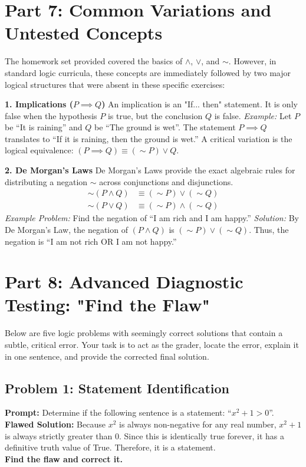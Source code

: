 \documentclass[11pt]{article}
\begin{document}
\section{Part 7: Common Variations and Untested Concepts}

The homework set provided covered the basics of $\land$, $\lor$, and $\sim$. However, in standard logic curricula, these concepts are immediately followed by two major logical structures that were absent in these specific exercises:

\textbf{1. Implications ($P \implies Q$)} 
An implication is an "If... then" statement. It is only false when the hypothesis $P$ is true, but the conclusion $Q$ is false. 
\textit{Example:} Let $P$ be ``It is raining'' and $Q$ be ``The ground is wet''. The statement $P \implies Q$ translates to ``If it is raining, then the ground is wet.''
A critical variation is the logical equivalence: $(P \implies Q) \equiv (\sim P) \lor Q$. 

\textbf{2. De Morgan's Laws}
De Morgan's Laws provide the exact algebraic rules for distributing a negation $\sim$ across conjunctions and disjunctions.
\begin{align*}
    \sim (P \land Q) &\equiv (\sim P) \lor (\sim Q) \\
    \sim (P \lor Q) &\equiv (\sim P) \land (\sim Q)
\end{align*}
\textit{Example Problem:} Find the negation of ``I am rich and I am happy.''
\textit{Solution:} By De Morgan's Law, the negation of $(P \land Q)$ is $(\sim P) \lor (\sim Q)$. Thus, the negation is ``I am not rich OR I am not happy.''

\section{Part 8: Advanced Diagnostic Testing: "Find the Flaw"}

Below are five logic problems with seemingly correct solutions that contain a subtle, critical error. Your task is to act as the grader, locate the error, explain it in one sentence, and provide the corrected final solution.

\subsection{Problem 1: Statement Identification}
\textbf{Prompt:} Determine if the following sentence is a statement: ``$x^2 + 1 > 0$''. \\
\textbf{Flawed Solution:} Because $x^2$ is always non-negative for any real number, $x^2 + 1$ is always strictly greater than $0$. Since this is identically true forever, it has a definitive truth value of True. Therefore, it is a statement. \\
\textbf{Find the flaw and correct it.}
\end{document}

